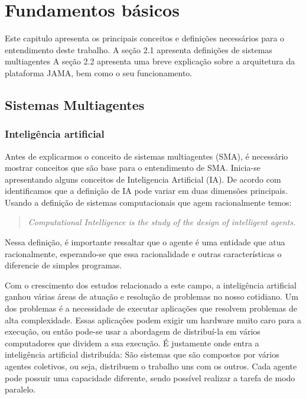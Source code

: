 \chapter{Fundamentos básicos}

Este capitulo apresenta os principais conceitos e definições necessários para o entendimento deste trabalho. A seção 2.1 apresenta definições de sistemas multiagentes
A seção 2.2 apresenta uma breve explicação sobre a arquitetura da plataforma JAMA, bem como o seu funcionamento.

\section{Sistemas Multiagentes}

\subsection{Inteligência artificial}

Antes de explicarmos o conceito de sistemas multiagentes (SMA), é necessário mostrar conceitos que são base para o entendimento de SMA. Inicia-se apresentando alguns conceitos de Inteligencia Artificial (IA). De acordo com~\cite{poole98} identificamos que a definição de IA pode variar em duas dimensões principais. Usando a definição de sistemas computacionais que agem racionalmente temos:

\begin{quote}
\emph{Computational Intelligence is the study of the design of intelligent agents.}
\end{quote}

Nessa definição, é importante ressaltar que o agente é uma entidade que atua racionalmente, esperando-se que essa racionalidade e outras características o diferencie de simples programas.

Com o crescimento dos estudos relacionado a este campo, a inteligência artificial ganhou várias áreas de atuação e resolução de problemas no nosso cotidiano. Um dos problemas é a necessidade de executar aplicações que resolvem problemas de alta complexidade. Essas aplicações podem exigir um hardware muito caro para a execução, ou então pode-se usar a abordagem de distribuí-la em vários computadores que dividem a sua execução. É justamente onde entra a inteligência artificial distribuída: São sistemas que são compostos por vários agentes coletivos, ou seja, distribuem o trabalho uns com os outros. Cada agente pode possuir uma capacidade diferente, sendo possível realizar a tarefa de modo paralelo. 

